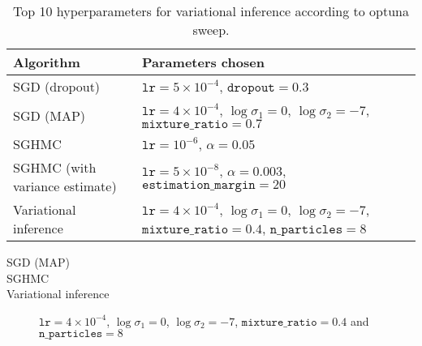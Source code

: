 \begin{table}[htbp]
    \centering
    \begin{tabular}{p{4cm}p{9cm}}
        \toprule
        Algorithm & Parameters chosen \\ \midrule
        SGD (dropout) & $\texttt{lr}=5\times 10^{-4}$,
        $\texttt{dropout}=0.3$ \\ \midrule
        SGD (MAP) & 
        $\texttt{lr}=4 \times 10^{-4}$, 
        $\log\sigma_1=0$, 
        $\log\sigma_2=-7$, 
        $\texttt{mixture\_ratio}=0.7$ \\ \midrule
        SGHMC & $\texttt{lr}=10^{-6}$, $\alpha=0.05$ \\ \midrule
        SGHMC (with variance estimate) &  $\texttt{lr}= 5 \times 10^{-8}$, 
        $\alpha=0.003$,
        $\texttt{estimation\_margin}=20$ \\ 
        Variational inference &    
        $\texttt{lr}=4 \times 10^{-4}$,
        $\log\sigma_1=0$,
        $\log\sigma_2=-7$,
        $\texttt{mixture\_ratio}=0.4$,
        $\texttt{n\_particles}=8$ \\
        \bottomrule
    \end{tabular}
    \caption{Top 10 hyperparameters for variational inference according to optuna sweep.}
    \label{tab:mnist-vi-hparams}
\end{table}

\begin{description}
    \item[] 
        
    \item[SGD (MAP)] 
        
    \item[SGHMC] 
        
    \item[] 
        
    \item[Variational inference] 
        $\texttt{lr}=4 \times 10^{-4}$,
        $\log\sigma_1=0$,
        $\log\sigma_2=-7$,
        $\texttt{mixture\_ratio}=0.4$ and
        $\texttt{n\_particles}=8$
\end{description}
